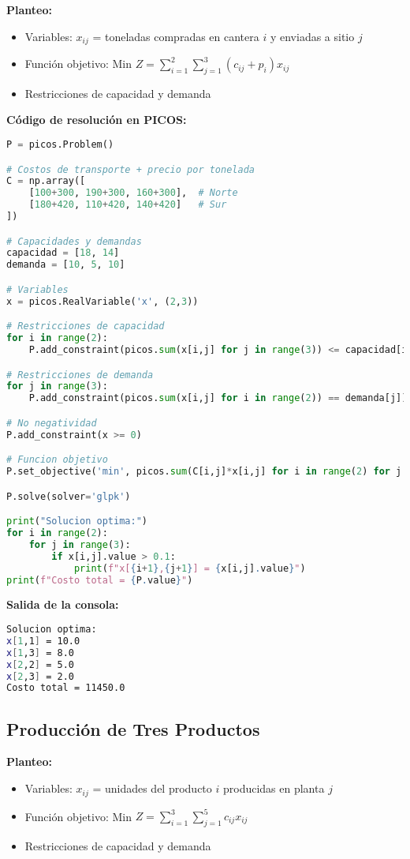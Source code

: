 \documentclass[12pt]{article}
\begin{document}
\textbf{Planteo:}
\begin{itemize}
\item Variables: $x_{ij}$ = toneladas compradas en cantera $i$ y enviadas a sitio $j$
\item Función objetivo: Min $Z = \sum_{i=1}^2 \sum_{j=1}^3 (c_{ij} + p_i)x_{ij}$
\item Restricciones de capacidad y demanda
\end{itemize}

\textbf{Código de resolución en PICOS:}
\begin{lstlisting}[language=Python]
P = picos.Problem()

# Costos de transporte + precio por tonelada
C = np.array([
    [100+300, 190+300, 160+300],  # Norte
    [180+420, 110+420, 140+420]   # Sur
])

# Capacidades y demandas
capacidad = [18, 14]
demanda = [10, 5, 10]

# Variables
x = picos.RealVariable('x', (2,3))

# Restricciones de capacidad
for i in range(2):
    P.add_constraint(picos.sum(x[i,j] for j in range(3)) <= capacidad[i])

# Restricciones de demanda
for j in range(3):
    P.add_constraint(picos.sum(x[i,j] for i in range(2)) == demanda[j])

# No negatividad
P.add_constraint(x >= 0)

# Funcion objetivo
P.set_objective('min', picos.sum(C[i,j]*x[i,j] for i in range(2) for j in range(3)))

P.solve(solver='glpk')

print("Solucion optima:")
for i in range(2):
    for j in range(3):
        if x[i,j].value > 0.1:
            print(f"x[{i+1},{j+1}] = {x[i,j].value}")
print(f"Costo total = {P.value}")
\end{lstlisting}

\textbf{Salida de la consola:}
\begin{lstlisting}[language=bash,backgroundcolor=\color{black},basicstyle=\color{white}\ttfamily,numbers=none]
Solucion optima:
x[1,1] = 10.0
x[1,3] = 8.0
x[2,2] = 5.0
x[2,3] = 2.0
Costo total = 11450.0
\end{lstlisting}

\subsection{Producción de Tres Productos}

\textbf{Planteo:}
\begin{itemize}
\item Variables: $x_{ij}$ = unidades del producto $i$ producidas en planta $j$
\item Función objetivo: Min $Z = \sum_{i=1}^3 \sum_{j=1}^5 c_{ij}x_{ij}$
\item Restricciones de capacidad y demanda
\end{itemize}
\end{document}
